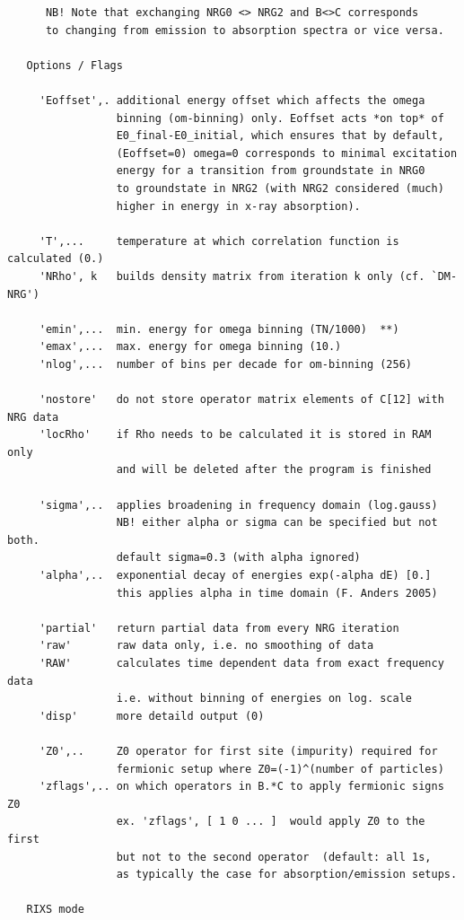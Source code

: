 \documentclass[twoside,12pt]{article}
\begin{document}
\begin{verbatim}
      NB! Note that exchanging NRG0 <> NRG2 and B<>C corresponds
      to changing from emission to absorption spectra or vice versa.
 
   Options / Flags
 
     'Eoffset',. additional energy offset which affects the omega
                 binning (om-binning) only. Eoffset acts *on top* of
                 E0_final-E0_initial, which ensures that by default,
                 (Eoffset=0) omega=0 corresponds to minimal excitation
                 energy for a transition from groundstate in NRG0
                 to groundstate in NRG2 (with NRG2 considered (much)
                 higher in energy in x-ray absorption).
 
     'T',...     temperature at which correlation function is calculated (0.)
     'NRho', k   builds density matrix from iteration k only (cf. `DM-NRG')
 
     'emin',...  min. energy for omega binning (TN/1000)  **)
     'emax',...  max. energy for omega binning (10.)
     'nlog',...  number of bins per decade for om-binning (256)
 
     'nostore'   do not store operator matrix elements of C[12] with NRG data
     'locRho'    if Rho needs to be calculated it is stored in RAM only
                 and will be deleted after the program is finished
 
     'sigma',..  applies broadening in frequency domain (log.gauss)
                 NB! either alpha or sigma can be specified but not both.
                 default sigma=0.3 (with alpha ignored)
     'alpha',..  exponential decay of energies exp(-alpha dE) [0.]
                 this applies alpha in time domain (F. Anders 2005)
 
     'partial'   return partial data from every NRG iteration
     'raw'       raw data only, i.e. no smoothing of data
     'RAW'       calculates time dependent data from exact frequency data
                 i.e. without binning of energies on log. scale
     'disp'      more detaild output (0)
 
     'Z0',..     Z0 operator for first site (impurity) required for
                 fermionic setup where Z0=(-1)^(number of particles)
     'zflags',.. on which operators in B.*C to apply fermionic signs Z0
                 ex. 'zflags', [ 1 0 ... ]  would apply Z0 to the first
                 but not to the second operator  (default: all 1s,
                 as typically the case for absorption/emission setups.
 
   RIXS mode
 

\end{verbatim}
\end{document}
